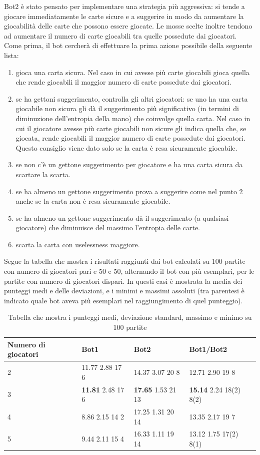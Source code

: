 \documentclass{article}
\begin{document}
\begin{flushleft}
Bot2 è stato pensato per implementare una strategia più aggressiva: si tende a giocare immediatamente le carte sicure e a suggerire in modo da aumentare la giocabilità delle carte che possono essere giocate. Le mosse scelte inoltre tendono ad aumentare il numero di carte giocabili tra quelle possedute dai giocatori. Come prima, il bot cercherà di effettuare la prima azione possibile della seguente lista:
\begin{enumerate}
    \item  gioca una carta sicura. Nel caso in cui avesse più carte giocabili gioca quella che rende giocabili il maggior numero di carte possedute dai giocatori.
    \item se ha gettoni suggerimento, controlla gli altri giocatori: se uno ha una carta giocabile non sicura gli dà il suggerimento più significativo (in termini di diminuzione dell'entropia della mano) che coinvolge quella carta. Nel caso in cui il giocatore avesse più carte giocabili non sicure gli indica quella che, se giocata, rende giocabili il maggior numero di carte possedute dai giocatori.
    Questo consiglio viene dato solo se la carta è resa sicuramente giocabile.
    \item se non c'è un gettone suggerimento per giocatore e ha una carta sicura da scartare la scarta.
  \item se ha almeno un gettone suggerimento prova a suggerire come nel punto 2 anche se la carta non è resa sicuramente giocabile.
  \item se ha almeno un gettone suggerimento dà il suggerimento (a qualsiasi giocatore) che diminuisce del massimo l'entropia delle carte.
    \item scarta la carta con uselessness maggiore.
\end{enumerate}
Segue la tabella che mostra i risultati raggiunti dai bot calcolati su 100 partite con numero di giocatori pari e 50 e 50, alternando il bot con più esemplari, per le partite con numero di giocatori dispari. In questi casi è mostrata la media dei punteggi medi e delle deviazioni, e i minimi e massimi assoluti (tra parentesi è indicato quale bot aveva più esemplari nel raggiungimento di quel punteggio).
\end{flushleft}
\begin{table}[h]
    \centering
    \begin{tabular}{m|b|b|b}
        \toprule
        \textbf{Numero di giocatori} & \textbf{Bot1} & \textbf{Bot2} & \textbf{Bot1/Bot2} \\
        \midrule
        2 & 11.77 2.88 17 6 & 14.37 3.07 20 8 & 12.71 2.90 19 8\\
        3 & \textbf{11.81} 2.48 17 6 & \textbf{17.65} 1.53 21 13& \textbf{15.14} 2.24 18(2) 8(2) \\
        4 & 8.86 2.15 14 2 & 17.25 1.31 20 14 & 13.35 2.17 19 7\\
        5 & 9.44 2.11 15 4 & 16.33 1.11 19 14 & 13.12 1.75 17(2) 8(1)  \\
    \end{tabular}
    \caption{Tabella che mostra i punteggi medi,  deviazione standard, massimo e minimo su 100 partite}
\end{table}
\end{document}
